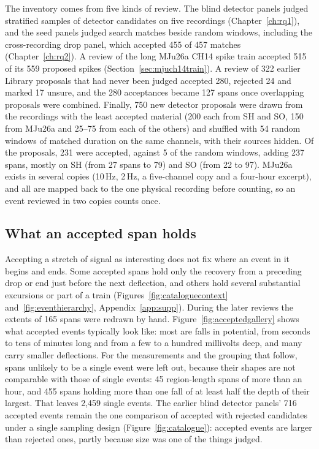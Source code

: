 The inventory comes from five kinds of review. The blind detector panels judged stratified samples of detector candidates on five recordings (Chapter~\ref{ch:rq1}), and the seed panels judged search matches beside random windows, including the cross-recording drop panel, which accepted 455 of 457 matches (Chapter~\ref{ch:rq2}). A review of the long MJu26a CH14 spike train accepted 515 of its 559 proposed spikes (Section~\ref{sec:mjuch14train}). A review of 322 earlier Library proposals that had never been judged accepted 280, rejected 24 and marked 17 unsure, and the 280 acceptances became 127 spans once overlapping proposals were combined. Finally, 750 new detector proposals were drawn from the recordings with the least accepted material (200 each from SH and SO, 150 from MJu26a and 25--75 from each of the others) and shuffled with 54 random windows of matched duration on the same channels, with their sources hidden. Of the proposals, 231 were accepted, against 5 of the random windows, adding 237 spans, mostly on SH (from 27 spans to 79) and SO (from 22 to 97). MJu26a exists in several copies (10\,Hz, 2\,Hz, a five-channel copy and a four-hour excerpt), and all are mapped back to the one physical recording before counting, so an event reviewed in two copies counts once.

\subsection{What an accepted span holds}

Accepting a stretch of signal as interesting does not fix where an event in it begins and ends. Some accepted spans hold only the recovery from a preceding drop or end just before the next deflection, and others hold several substantial excursions or part of a train (Figures~\ref{fig:cataloguecontext} and~\ref{fig:eventhierarchy}, Appendix~\ref{app:supp}). During the later reviews the extents of 165 spans were redrawn by hand. Figure~\ref{fig:acceptedgallery} shows what accepted events typically look like: most are falls in potential, from seconds to tens of minutes long and from a few to a hundred millivolts deep, and many carry smaller deflections. For the measurements and the grouping that follow, spans unlikely to be a single event were left out, because their shapes are not comparable with those of single events: 45 region-length spans of more than an hour, and 455 spans holding more than one fall of at least half the depth of their largest. That leaves 2,459 single events. The earlier blind detector panels' 716 accepted events remain the one comparison of accepted with rejected candidates under a single sampling design (Figure~\ref{fig:catalogue}): accepted events are larger than rejected ones, partly because size was one of the things judged.

